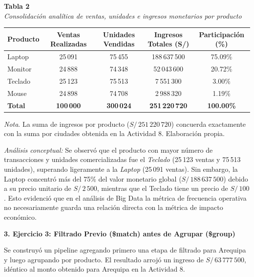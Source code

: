 \documentclass[12pt,a4paper]{article}
\begin{document}
\begin{center}
\small
\noindent\textbf{Tabla 2} \\
\textit{Consolidación analítica de ventas, unidades e ingresos monetarios por producto}
\vspace{4pt}

\begin{tabular}{lcccc}
    \toprule
    \textbf{Producto} & \textbf{Ventas Realizadas} & \textbf{Unidades Vendidas} & \textbf{Ingresos Totales (S/)} & \textbf{Participación (\%)} \\
    \midrule
    Laptop & 25\,091 & 75\,455 & 188\,637\,500 & 75.09\% \\
    Monitor & 24\,888 & 74\,348 & 52\,043\,600 & 20.72\% \\
    Teclado & 25\,123 & 75\,513 & 7\,551\,300 & 3.00\% \\
    Mouse & 24\,898 & 74\,708 & 2\,988\,320 & 1.19\% \\
    \midrule
    \textbf{Total} & \textbf{100\,000} & \textbf{300\,024} & \textbf{251\,220\,720} & \textbf{100.00\%} \\
    \bottomrule
\end{tabular}
\vspace{3pt}

\raggedright\footnotesize\textit{Nota}. La suma de ingresos por producto ($S/\,251\,220\,720$) concuerda exactamente con la suma por ciudades obtenida en la Actividad 8. Elaboración propia.
\end{center}

\noindent\textit{Análisis conceptual:} Se observó que el producto con mayor número de transacciones y unidades comercializadas fue el \textit{Teclado} (25\,123 ventas y 75\,513 unidades), superando ligeramente a la \textit{Laptop} (25\,091 ventas). Sin embargo, la Laptop concentró más del 75\% del valor monetario global ($S/\,188\,637\,500$) debido a su precio unitario de $S/\,2\,500$, mientras que el Teclado tiene un precio de $S/\,100$. Esto evidenció que en el análisis de Big Data la métrica de frecuencia operativa no necesariamente guarda una relación directa con la métrica de impacto económico.

\vspace{0.3cm}
\noindent\textbf{3. Ejercicio 3: Filtrado Previo (\$match) antes de Agrupar (\$group)}

Se construyó un pipeline agregando primero una etapa de filtrado para Arequipa y luego agrupando por producto. El resultado arrojó un ingreso de $S/\,63\,777\,500$, idéntico al monto obtenido para Arequipa en la Actividad 8.
\end{document}
